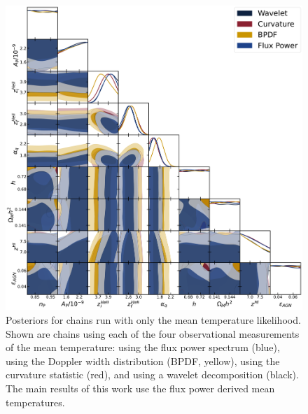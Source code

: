 \documentclass[a4paper,11pt]{article}
\begin{document}
\begin{figure}
    \centering
    \includegraphics[width=\textwidth]{figures/datasets_t0_corner.pdf}
    \caption{\label{fig:t0_datasets}
    Posteriors for chains run with only the mean temperature likelihood.
    Shown are chains using each of the four observational measurements of the mean temperature: using the flux power spectrum (blue), using the Doppler width distribution (BPDF, yellow), using the curvature statistic (red), and using a wavelet decomposition (black).
    The main results of this work use the flux power derived mean temperatures.
    }
\end{figure}



\end{document}
